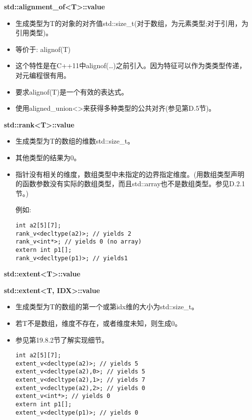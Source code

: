 \textbf{std::alignment\_of<T>::value}

\begin{itemize}
\item 
生成类型为T的对象的对齐值std::size\_t(对于数组，为元素类型;对于引用，为引用类型)。

\item 
等价于: alignof(T)

\item 
这个特性是在C++11中alignof(…)之前引入。因为特征可以作为类类型传递，对元编程很有用。

\item 
要求alignof(T)是一个有效的表达式。

\item 
使用aligned\_union<>来获得多种类型的公共对齐(参见第D.5节)。
\end{itemize}

\textbf{std::rank<T>::value}

\begin{itemize}
\item 
生成类型为T的数组的维数std::size\_t。

\item 
其他类型的结果为0。

\item 
指针没有相关的维度，数组类型中未指定的边界指定维度。(用数组类型声明的函数参数没有实际的数组类型，而且std::array也不是数组类型。参见D.2.1节。)

例如:
\begin{lstlisting}[style=styleCXX]
int a2[5][7];
rank_v<decltype(a2)>; // yields 2
rank_v<int*>; // yields 0 (no array)
extern int p1[];
rank_v<decltype(p1)>; // yields1
\end{lstlisting}
\end{itemize}

\textbf{std::extent<T>::value}

\textbf{std::extent<T, IDX>::value}

\begin{itemize}
\item 
生成类型为T的数组的第一个或第idx维的大小为std::size\_t。

\item 
若T不是数组，维度不存在，或者维度未知，则生成0。

\item 
参见第19.8.2节了解实现细节。

\begin{lstlisting}[style=styleCXX]
int a2[5][7];
extent_v<decltype(a2)>; // yields 5
extent_v<decltype(a2),0>; // yields 5
extent_v<decltype(a2),1>; // yields 7
extent_v<decltype(a2),2>; // yields 0
extent_v<int*>; // yields 0
extern int p1[];
extent_v<decltype(p1)>; // yields 0
\end{lstlisting}
\end{itemize}

